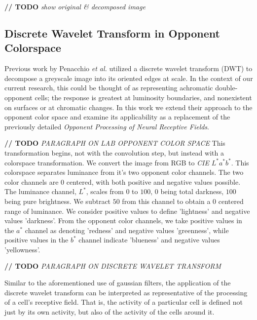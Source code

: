 \documentclass[journal,onecolumn]{IEEEtran}
\begin{document}
\textbf{// TODO} \textit{show original \& decomposed image}


\subsection{Discrete Wavelet Transform in Opponent Colorspace}

Previous work by Penacchio \textit{et al.} \cite{otazu:plosone} utilized a discrete wavelet transform (DWT) to decompose a greyscale image into its oriented edges at scale. In the context of our current research, this could be thought of as representing achromatic double-opponent cells; the response is greatest at luminosity boundaries, and nonexistent on surfaces or at chromatic changes. In this work we extend their approach to the opponent color space and examine its applicability as a replacement of the previously detailed \textit{Opponent Processing of Neural Receptive Fields}.

\textbf{// TODO} \textit{PARAGRAPH ON LAB OPPONENT COLOR SPACE}
This transformation begins, not with the convolution step, but instead with a colorspace transformation. We convert the image from RGB to \textit{CIE} $L^*a^*b^*$. This colorspace separates luminance from it's two opponent color channels. The two color channels are $0$ centered, with both positive and negative values possible. The luminance channel, $L^*$, scales from $0$ to $100$, $0$ being total darkness, $100$ being pure brightness. We subtract $50$ from this channel to obtain a $0$ centered range of luminance. We consider positive values to define 'lightness' and negative values 'darkness'. From the opponent color channels, we take positive values in the $a^*$ channel as denoting 'redness' and negative values 'greenness', while positive values in the $b^*$ channel indicate 'blueness' and negative values 'yellowness'.

\textbf{// TODO} \textit{PARAGRAPH ON DISCRETE WAVELET TRANSFORM}

Similar to the aforementioned use of gaussian filters, the application of the discrete wavelet transform can be interpreted as representative of the processing of a cell's receptive field. That is, the activity of a particular cell is defined not just by its own activity, but also of the activity of the cells around it.
\end{document}
